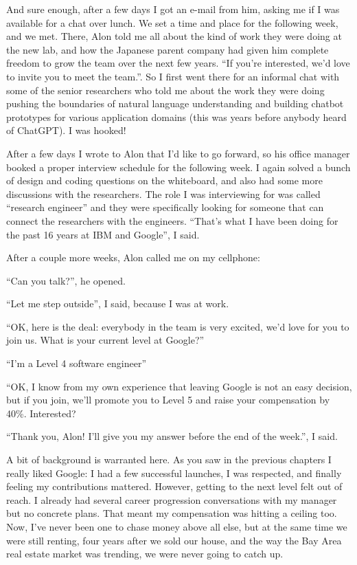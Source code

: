 \documentclass[12pt]{book}
\begin{document}
And sure enough, after a few days I got an e-mail from him, asking me if
I was available for a chat over lunch. We set a time and place for the
following week, and we met. There, Alon told me all about the kind of
work they were doing at the new lab, and how the Japanese parent company
had given him complete freedom to grow the team over the next few years.
``If you're interested, we'd love to invite you to meet the team.''. So
I first went there for an informal chat with some of the senior
researchers who told me about the work they were doing pushing the
boundaries of natural language understanding and building chatbot
prototypes for various application domains (this was years before
anybody heard of ChatGPT). I was hooked!

After a few days I wrote to Alon that I'd like to go forward, so his
office manager booked a proper interview schedule for the following
week. I again solved a bunch of design and coding questions on the
whiteboard, and also had some more discussions with the researchers. The
role I was interviewing for was called ``research engineer'' and they
were specifically looking for someone that can connect the researchers
with the engineers. ``That's what I have been doing for the past 16
years at IBM and Google'', I said.

After a couple more weeks, Alon called me on my cellphone:

``Can you talk?'', he opened.

``Let me step outside'', I said, because I was at work.

``OK, here is the deal: everybody in the team is very excited, we'd love
for you to join us. What is your current level at Google?''

``I'm a Level 4 software engineer''

``OK, I know from my own experience that leaving Google is not an easy
decision, but if you join, we'll promote you to Level 5 and raise your
compensation by 40\%. Interested?

``Thank you, Alon! I'll give you my answer before the end of the
week.'', I said.

A bit of background is warranted here. As you saw in the previous
chapters I really liked Google: I had a few successful launches, I was
respected, and finally feeling my contributions mattered. However,
getting to the next level felt out of reach. I already had several
career progression conversations with my manager but no concrete plans.
That meant my compensation was hitting a ceiling too. Now, I've never
been one to chase money above all else, but at the same time we were
still renting, four years after we sold our house, and the way the Bay
Area real estate market was trending, we were never going to catch up.
\end{document}
